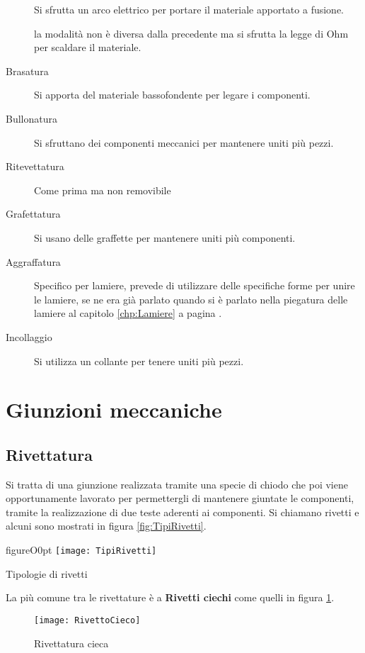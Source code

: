 \begin{description}
\item[] Si sfrutta un arco elettrico per portare il materiale apportato a fusione.
\item[] la modalità non è diversa dalla precedente ma si sfrutta la legge di Ohm per scaldare il materiale.
\item[Brasatura] Si apporta del materiale bassofondente per legare i componenti.
\item[Bullonatura] Si sfruttano dei componenti meccanici per mantenere uniti più pezzi.
\item[Ritevettatura] Come prima ma non removibile
\item[Grafettatura] Si usano delle graffette per mantenere uniti più componenti.
\item[Aggraffatura] Specifico per lamiere, prevede di utilizzare delle specifiche forme per unire le lamiere, se ne era già parlato quando si è parlato nella piegatura delle lamiere al capitolo \ref{chp:Lamiere} a pagina \pageref{chp:Lamiere}.
\item[Incollaggio] Si utilizza un collante per tenere uniti più pezzi.
\end{description}

\section{Giunzioni meccaniche}
\subsection{Rivettatura}
Si tratta di una giunzione realizzata tramite una specie di chiodo che poi viene opportunamente lavorato per permettergli di mantenere giuntate le componenti, tramite la realizzazione di due teste aderenti ai componenti.
Si chiamano rivetti e alcuni sono mostrati in figura \ref{fig:TipiRivetti}.

\begin{wrapfloat}{figure}{O}{0pt}
\texttt{[image: TipiRivetti]}
\caption{Tipologie di rivetti}
\label{fig:TipiRivetti}
\end{wrapfloat}

La più comune tra le rivettature è a \textbf{Rivetti ciechi} come quelli in figura \ref{fig:RivettoCieco}.

\begin{figure}
\centering
\texttt{[image: RivettoCieco]}
\caption{Rivettatura cieca}
\label{fig:RivettoCieco}
\end{figure}

